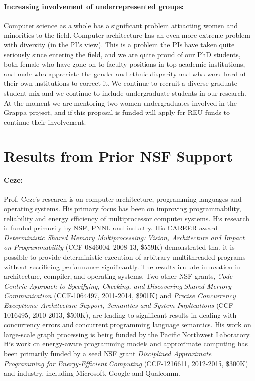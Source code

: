\paragraph{Increasing involvement of underrepresented groups:} Computer science as a whole has a significant problem attracting women and minorities to the field.  Computer architecture has an even more extreme problem with diversity (in the PI's view).  This is a problem the PIs have taken quite seriously since entering the field, and we are quite proud of our PhD students, both female who have gone on to faculty positions in top academic institutions, and male who appreciate the gender and ethnic disparity and who work hard at their own institutions to correct it.  We continue to recruit a diverse graduate student mix and we continue to include undergraduate students in our research.  At the moment we are mentoring two women undergraduates involved in the Grappa project, and if this proposal is funded will apply for REU funds to continue their involvement.

\section{Results from Prior NSF Support}

\paragraph{Ceze:} Prof. Ceze's research is on computer architecture, programming languages and operating systems. His primary focus has been on improving programmability, reliability and energy efficiency of multiprocessor computer systems. His research is funded primarily by NSF, PNNL and industry. His CAREER award {\em Deterministic Shared Memory Multiprocessing: Vision, Architecture and Impact on Programmability} (CCF-0846004, 2008-13, \$559K) demonstrated that it is possible to provide deterministic execution of arbitrary multithreaded programs without sacrificing performance significantly. The results include innovation in architecture, compiler, and operating-systems. Two other NSF grants, {\em Code-Centric Approach to Specifying, Checking, and Discovering Shared-Memory Communication} (CCF-1064497, 2011-2014, \$901K) and {\em Precise Concurrency Exceptions: Architecture Support, Semantics and System Implications} (CCF-1016495, 2010-2013, \$500K), are leading to significant results in dealing with concurrency errors and concurrent programming language semantics. His work on large-scale graph processing is being funded by the Pacific Northwest Laboratory. His work on energy-aware programming models and approximate computing has been primarily funded by a seed NSF grant {\em Disciplined Approximate Programming for Energy-Efficient Computing} (CCF-1216611, 2012-2015, \$300K) and industry, including Microsoft, Google and Qualcomm.

